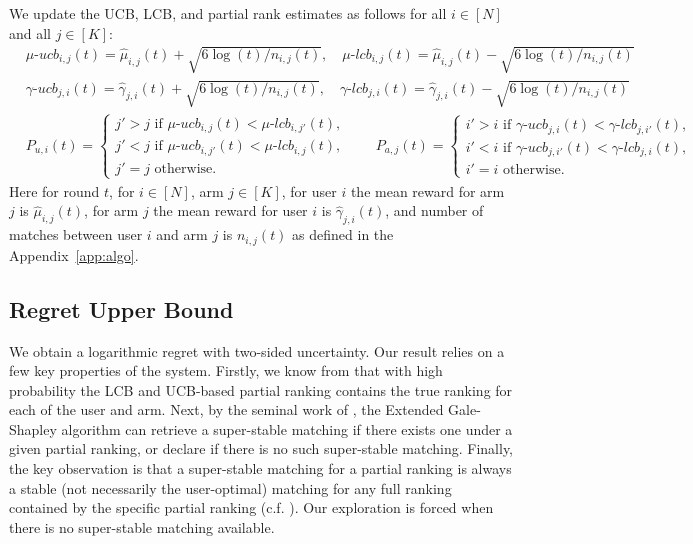 \documentclass{article}
\newcommand\uucb{\mu\text{-}ucb}
\newcommand\ulcb{\mu\text{-}lcb}
\newcommand\aucb{\gamma\text{-}ucb}
\newcommand\alcb{\gamma\text{-}lcb}
\begin{document}
We update the UCB, LCB, and partial rank estimates as follows for all $i \in [N]$ and all $j \in [K]$:
\begin{align}
    & \uucb_{i,j}(t) = \hat{\mu}_{i,j}(t) + \sqrt{6 \log(t) / n_{i,j}(t)}, \quad \ulcb_{i,j}(t) = \hat{\mu}_{i,j}(t) - \sqrt{6 \log(t) / n_{i,j}(t)} \label{eq:user-cb} \\
    & \aucb_{j, i}(t) = \hat{\gamma}_{j, i}(t) + \sqrt{6 \log(t) / n_{i,j}(t)}, \quad \alcb_{j, i}(t) = \hat{\gamma}_{j, i}(t) - \sqrt{6 \log(t) / n_{i,j}(t)} \label{eq:arm-cb}\\
    & P_{u,i}(t) = \begin{cases}
       j' > j  \text{ if } \uucb_{i,j}(t) < \ulcb_{i,j'}(t),\\
       j' < j  \text{ if } \uucb_{i,j'}(t) < \ulcb_{i,j}(t),\\
       j' = j  \text{ otherwise.}
    \end{cases} %
    \quad\quad
    P_{a,j}(t) = \begin{cases}
       i' > i  \text{ if } \aucb_{j,i}(t) < \alcb_{j,i'}(t),\\
       i' < i  \text{ if } \aucb_{j,i'}(t) < \alcb_{j,i}(t),\\
       i' = i  \text{ otherwise.}
    \end{cases} \label{eq:pr}
\end{align}
Here for round $t$, for $i\in [N]$, arm $j \in [K]$, for user $i$ the mean reward for arm $j$ is $\hat{\mu}_{i,j}(t)$, for arm $j$ the mean reward for user $i$ is $\hat{\gamma}_{j, i}(t)$, and number of matches between user $i$ and arm $j$ is $n_{i,j}(t)$ as defined in the Appendix~\ref{app:algo}.

\subsection{Regret Upper Bound}
We obtain a logarithmic regret with two-sided uncertainty. Our result relies on a few key properties of the system. Firstly, we know from \cite{kong2023playeroptimal} that with high probability the LCB and UCB-based partial ranking contains the true ranking for each of the user and arm. Next, by the seminal work of \cite{irving1994stable}, the Extended Gale-Shapley algorithm can retrieve a super-stable matching if there exists one under a given partial ranking, or declare if there is no such super-stable matching. Finally, the key observation is that a super-stable matching for a partial ranking is always a stable (not necessarily the user-optimal) matching for any full ranking contained by the specific partial ranking (c.f. \cite{spieker1995set}). Our exploration is forced when there is no super-stable matching available. 
\end{document}
